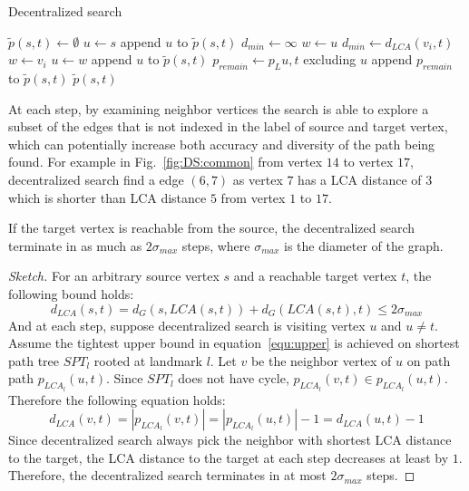 \begin{algorithm}
    \caption{Decentralized search}
		\label{alg:dec}
    \begin{algorithmic}
						\State $\tilde{p}(s,t) \gets \emptyset$
						\State $u \gets s$
						\State append $u$ to $\tilde{p}(s,t)$
								\State $d_{min} \gets \infty$
								\State $w \gets u$
												\State $d_{min} \gets d_{LCA}(v_i,t)$
												\State $w \gets v_i$ 
										\EndIf
								\EndFor
								\State $u \gets w$
								\State append $u$ to $\tilde{p}(s,t)$
						\EndWhile
						\State $p_{remain} \gets p_L{u,t}$ excluding $u$
						\State append $p_{remain}$ to $\tilde{p}(s,t)$
						\State \Return $\tilde{p}(s,t)$
        \EndFunction
    \end{algorithmic}
\end{algorithm}

At each step, by examining neighbor vertices the search is able to explore a subset of the edges that is not indexed in the label of source and target vertex, which can potentially increase both accuracy and diversity of the path being found. For example in Fig.~\ref{fig:DS:common} from vertex $14$ to vertex $17$, decentralized search find a edge $(6, 7)$ as vertex $7$ has a LCA distance of $3$ which is shorter than LCA distance $5$ from vertex $1$ to $17$. 

\begin{theorem}
\label{theorem:max_step}
If the target vertex is reachable from the source, the decentralized search terminate in as much as $2{\sigma}_{max}$ steps, where ${\sigma}_{max}$ is the diameter of the graph. 
\end{theorem}
\begin{proof}[Sketch]
For an arbitrary source vertex $s$ and a reachable target vertex $t$, the following bound holds:
\[
    d_{LCA}(s,t) = d_G(s,LCA(s,t)) + d_G(LCA(s,t),t) \leq 2{\sigma}_{max}
\]
And at each step, suppose decentralized search is visiting vertex $u$ and $u \neq t$. Assume the tightest upper bound in equation~\ref{equ:upper} is achieved on shortest path tree $SPT_l$ rooted at landmark $l$. Let $v$ be the neighbor vertex of $u$ on path path $p_{LCA_l}(u,t)$. Since $SPT_l$ does not have cycle, $p_{LCA_l}(v,t) \in p_{LCA_l}(u,t)$. Therefore the following equation holds:
\[
		d_{LCA}(v,t) = |p_{LCA_l}(v,t)| = |p_{LCA_l}(u,t)| - 1 = d_{LCA}(u,t) - 1
\]
Since decentralized search always pick the neighbor with shortest LCA distance to the target, the LCA distance to the target at each step decreases at least by $1$. Therefore, the decentralized search terminates in at most $2{\sigma}_{max}$ steps. 
\end{proof}

